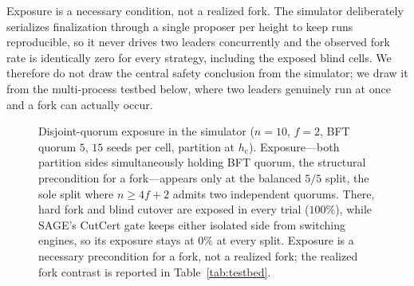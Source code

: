 \documentclass[journal]{IEEEtran}
\theoremstyle{definition}
\theoremstyle{remark}
\begin{document}
Exposure is a necessary condition, not a realized fork. The simulator deliberately serializes
finalization through a single proposer per height to keep runs reproducible, so it never drives
two leaders concurrently and the observed fork rate is identically zero for every strategy,
including the exposed blind cells. We therefore do not draw the central safety conclusion from the
simulator; we draw it from the multi-process testbed below, where two leaders genuinely run at
once and a fork can actually occur.

\begin{figure}[t]
\centering
{}
\caption{Disjoint-quorum exposure in the simulator ($n{=}10$, $f{=}2$, BFT quorum $5$,
$15$ seeds per cell, partition at $h_{\mathrm{c}}$). Exposure---both partition sides
simultaneously holding BFT quorum, the structural precondition for a fork---appears only at the
balanced $5/5$ split, the sole split where $n\ge 4f{+}2$ admits two independent quorums. There,
hard fork and blind cutover are exposed in every trial ($100\%$), while SAGE's CutCert gate keeps
either isolated side from switching engines, so its exposure stays at $0\%$ at every split.
Exposure is a necessary precondition for a fork, not a realized fork; the realized fork contrast
is reported in Table~\ref{tab:testbed}.}
\label{fig:safety}
\end{figure}
\end{document}
